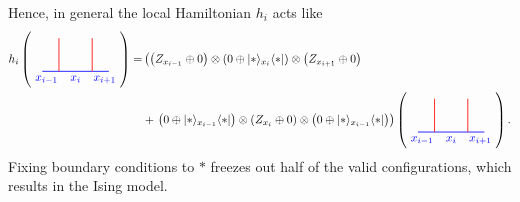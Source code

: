 Hence, in general the local Hamiltonian $h_i$ acts like
	\begin{align*}
		h_i \left(\begin{tikzpicture}[scale=1,baseline=(current bounding box.center)]
		\draw [blue, line width=0.25mm] (-0.5,0) to node[below, near start] {$x_{i-1}$} (0,0);
		\draw [blue, line width=0.25mm] (0,0) to node[below] {$x_i$} (1,0);
		\draw [blue, line width=0.25mm] (1,0) to node[below, near end] {$x_{i+1}$} (1.5,0);
		\draw [red, line width=0.25mm] (0,0) -- (0,1);
		\draw [red, line width=0.25mm] (1,0) -- (1,1);
		\end{tikzpicture}\right)=&\left(\left(Z_{x_{i-1}}\oplus 0\right)\otimes\left(0\oplus\lvert*\rangle_{x_i}\langle*\rvert\right)\otimes\left(Z_{x_{i+1}}\oplus 0\right)\right.\\&+\left.\left(0\oplus\lvert*\rangle_{x_{i-1}}\langle*\rvert\right)\otimes\left(Z_{x_i}\oplus 0\right)\otimes\left(0\oplus \lvert *\rangle_{x_{i-1}}\langle *\rvert\right)\right)\left(\begin{tikzpicture}[scale=1,baseline=(current bounding box.center)]
		\draw [blue, line width=0.25mm] (-0.5,0) to node[below, near start] {$x_{i-1}$} (0,0);
		\draw [blue, line width=0.25mm] (0,0) to node[below] {$x_i$} (1,0);
		\draw [blue, line width=0.25mm] (1,0) to node[below, near end] {$x_{i+1}$} (1.5,0);
		\draw [red, line width=0.25mm] (0,0) -- (0,1);
		\draw [red, line width=0.25mm] (1,0) -- (1,1);
		\end{tikzpicture}\right).
	\end{align*}
Fixing boundary conditions to $*$ freezes out half of the valid configurations, which results in the Ising model.